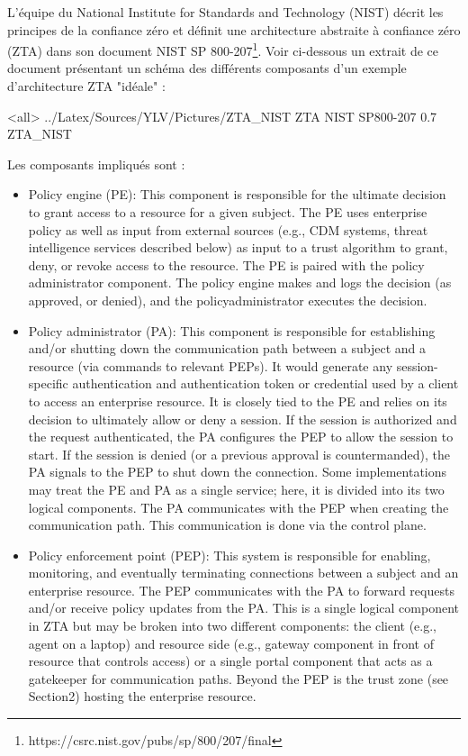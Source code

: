 L’équipe du National Institute for Standards and Technology (NIST) décrit les principes de la confiance zéro et définit une architecture abstraite à confiance zéro (ZTA) dans son document NIST SP 800-207\footnote{https://csrc.nist.gov/pubs/sp/800/207/final}. Voir ci-dessous un extrait de ce document présentant un schéma des différents composants d'un exemple d'architecture ZTA "idéale" :

\mode<all>{\picframe
{../Latex/Sources/YLV/Pictures/ZTA_NIST}%
{ZTA NIST SP800-207} %
{0.7} %
{ZTA_NIST} %
}

Les composants impliqués sont :
\begin{itemize}
    \item Policy engine (PE): This component is responsible for the ultimate decision to grant access to a resource for a given subject. The PE uses enterprise policy as well as input from external sources (e.g., CDM systems, threat intelligence services described below) as input to a trust algorithm to grant, deny, or revoke access to the resource. The PE is paired with the policy administrator component. The policy engine makes and logs the decision (as approved, or denied), and the policyadministrator executes the decision.
    \item Policy administrator (PA): This component is responsible for establishing and/or shutting down the communication path between a subject and a resource (via commands to relevant PEPs). It would generate any session-specific authentication and authentication token or credential used by a client to access an enterprise resource. It is closely tied to the PE and relies on its decision to ultimately allow or deny a session. If the session is authorized and the request authenticated, the PA configures the PEP to allow the session to start. If the session is denied (or a previous approval is countermanded), the PA signals to the PEP to shut down the connection. Some implementations may treat the PE and PA as a single service; here, it is divided into its two logical components. The PA communicates with the PEP when creating the communication path. This communication is done via the control plane.
    \item Policy enforcement point (PEP): This system is responsible for enabling, monitoring, and eventually terminating connections between a subject and an enterprise resource. The PEP communicates with the PA to forward requests and/or receive policy updates from the PA. This is a single logical component in ZTA but may be broken into two different components: the client (e.g., agent on a laptop) and resource side (e.g., gateway component in front of resource that controls access) or a single portal component that acts as a gatekeeper for communication paths. Beyond the PEP is the trust zone (see Section2) hosting the enterprise resource.

\end{itemize}

